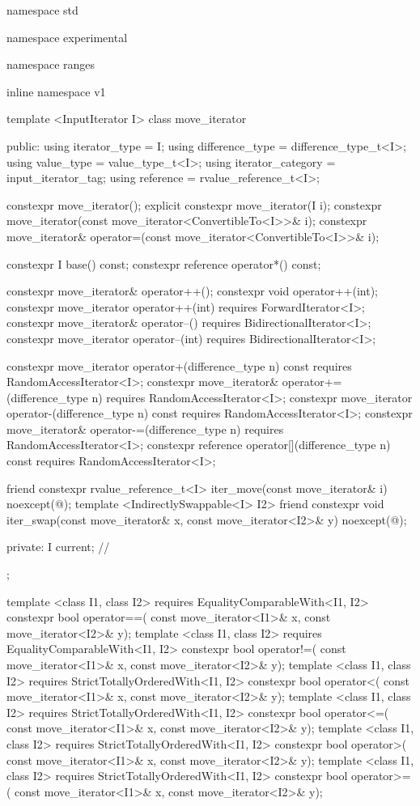 %
\begin{codeblock}
namespace std { namespace experimental { namespace ranges { inline namespace v1 {
  template <InputIterator I>
  class move_iterator {
  public:
    using iterator_type     = I;
    using difference_type   = difference_type_t<I>;
    using value_type        = value_type_t<I>;
    using iterator_category = input_iterator_tag;
    using reference         = rvalue_reference_t<I>;

    constexpr move_iterator();
    explicit constexpr move_iterator(I i);
    constexpr move_iterator(const move_iterator<ConvertibleTo<I>>& i);
    constexpr move_iterator& operator=(const move_iterator<ConvertibleTo<I>>& i);

    constexpr I base() const;
    constexpr reference operator*() const;

    constexpr move_iterator& operator++();
    constexpr void operator++(int);
    constexpr move_iterator operator++(int)
      requires ForwardIterator<I>;
    constexpr move_iterator& operator--()
      requires BidirectionalIterator<I>;
    constexpr move_iterator operator--(int)
      requires BidirectionalIterator<I>;

    constexpr move_iterator operator+(difference_type n) const
      requires RandomAccessIterator<I>;
    constexpr move_iterator& operator+=(difference_type n)
      requires RandomAccessIterator<I>;
    constexpr move_iterator operator-(difference_type n) const
      requires RandomAccessIterator<I>;
    constexpr move_iterator& operator-=(difference_type n)
      requires RandomAccessIterator<I>;
    constexpr reference operator[](difference_type n) const
      requires RandomAccessIterator<I>;

    friend constexpr rvalue_reference_t<I> iter_move(const move_iterator& i)
      noexcept(@\seebelow@);
    template <IndirectlySwappable<I> I2>
      friend constexpr void iter_swap(const move_iterator& x, const move_iterator<I2>& y)
        noexcept(@\seebelow@);

  private:
    I current; // \expos
  };

  template <class I1, class I2>
      requires EqualityComparableWith<I1, I2>
    constexpr bool operator==(
      const move_iterator<I1>& x, const move_iterator<I2>& y);
  template <class I1, class I2>
      requires EqualityComparableWith<I1, I2>
    constexpr bool operator!=(
      const move_iterator<I1>& x, const move_iterator<I2>& y);
  template <class I1, class I2>
      requires StrictTotallyOrderedWith<I1, I2>
    constexpr bool operator<(
      const move_iterator<I1>& x, const move_iterator<I2>& y);
  template <class I1, class I2>
      requires StrictTotallyOrderedWith<I1, I2>
    constexpr bool operator<=(
      const move_iterator<I1>& x, const move_iterator<I2>& y);
  template <class I1, class I2>
      requires StrictTotallyOrderedWith<I1, I2>
    constexpr bool operator>(
      const move_iterator<I1>& x, const move_iterator<I2>& y);
  template <class I1, class I2>
      requires StrictTotallyOrderedWith<I1, I2>
    constexpr bool operator>=(
      const move_iterator<I1>& x, const move_iterator<I2>& y);

}}}}
\end{codeblock}
